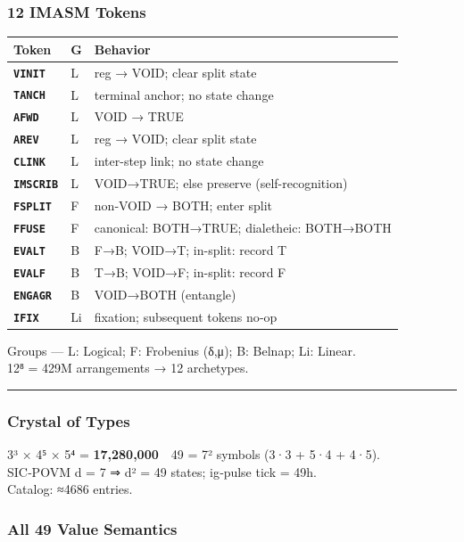 \hypertarget{imasm-tokens}{%
\subsubsection{12 IMASM Tokens}\label{imasm-tokens}}

\begin{longtable}[]{@{}lll@{}}
\toprule
Token & G & Behavior\tabularnewline
\midrule
\endhead
\textbf{\texttt{VINIT}} & L & reg → VOID; clear split
state\tabularnewline
\textbf{\texttt{TANCH}} & L & terminal anchor; no state
change\tabularnewline
\textbf{\texttt{AFWD}} & L & VOID → TRUE\tabularnewline
\textbf{\texttt{AREV}} & L & reg → VOID; clear split
state\tabularnewline
\textbf{\texttt{CLINK}} & L & inter-step link; no state
change\tabularnewline
\textbf{\texttt{IMSCRIB}} & L & VOID→TRUE; else preserve
(self-recognition)\tabularnewline
\textbf{\texttt{FSPLIT}} & F & non‑VOID → BOTH; enter
split\tabularnewline
\textbf{\texttt{FFUSE}} & F & canonical: BOTH→TRUE; dialetheic:
BOTH→BOTH\tabularnewline
\textbf{\texttt{EVALT}} & B & F→B; VOID→T; in-split: record
T\tabularnewline
\textbf{\texttt{EVALF}} & B & T→B; VOID→F; in-split: record
F\tabularnewline
\textbf{\texttt{ENGAGR}} & B & VOID→BOTH (entangle)\tabularnewline
\textbf{\texttt{IFIX}} & Li & fixation; subsequent tokens
no‑op\tabularnewline
\bottomrule
\end{longtable}

Groups --- L: Logical; F: Frobenius (δ,μ); B: Belnap; Li: Linear.\\
12⁸ = 429M arrangements → 12 archetypes.

\begin{center}\rule{0.5\linewidth}{0.5pt}\end{center}

\hypertarget{crystal-of-types}{%
\subsubsection{Crystal of Types}\label{crystal-of-types}}

3³ × 4⁵ × 5⁴ = \textbf{17,280,000} 49 = 7² symbols (3·3 + 5·4 + 4·5).\\
SIC‑POVM d = 7 ⇒ d² = 49 states; ig‑pulse tick = 49h.\\
Catalog: ≈4686 entries.

\hypertarget{all-49-value-semantics}{%
\subsubsection{All 49 Value Semantics}\label{all-49-value-semantics}}

